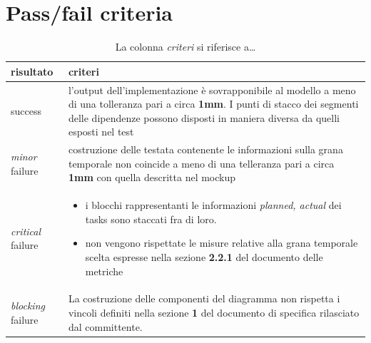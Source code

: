 \section{Pass/fail criteria}
\begin{table}[h!]
  \begin{center}
    \begin{tabular}{| l | p{100mm} |}
    \hline
    \textbf{risultato} & \textbf{criteri} \\
	\hline    
	success & l'output dell'implementazione \`e sovrapponibile al modello a meno 
di una tolleranza pari a circa \textbf{1mm}. I punti di stacco dei segmenti
delle dipendenze possono disposti in maniera diversa da quelli esposti nel test
\\
    \hline
    \emph{minor} failure & costruzione delle testata contenente le informazioni
    sulla grana temporale non coincide a meno di una telleranza pari a circa 
    \textbf{1mm} con quella descritta nel mockup
    \\
    \hline
    \emph{critical} failure & 
    \begin{itemize}
    \item i blocchi rappresentanti le informazioni \emph{planned, actual} dei
    tasks sono staccati fra di loro. 
    \item non vengono rispettate le misure relative alla grana temporale
    scelta espresse nella sezione \textbf{2.2.1} del documento delle metriche 
    \end{itemize}\\
    \hline
    \emph{blocking} failure & La costruzione delle componenti del diagramma
    non rispetta i vincoli definiti nella sezione \textbf{1} del documento di 
   specifica rilasciato dal committente. \\
    \hline
    \end{tabular}
  \end{center}
	\caption{La colonna \emph{criteri} si riferisce a\ldots}
\end{table}